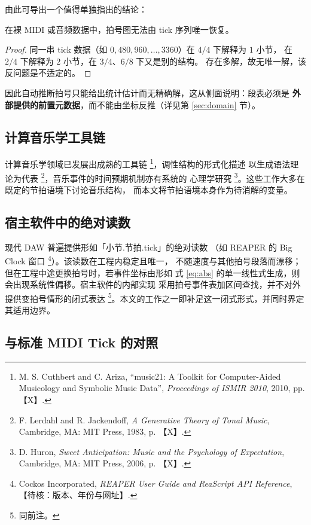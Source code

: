 \documentclass[11pt,a4paper,fontset=none]{ctexart}
\begin{document}
由此可导出一个值得单独指出的结论：

\begin{命题}
\label{prop:notick}
在裸 MIDI 或音频数据中，拍号图无法由 tick 序列唯一恢复。
\end{命题}

\begin{proof}
同一串 tick 数据（如 $0,480,960,\dots,3360$）在 $4/4$ 下解释为 $1$ 小节，
在 $2/4$ 下解释为 $2$ 小节，在 $3/4$、$6/8$ 下又是别的结构。
存在多解，故无唯一解，该反问题是不适定的。
\end{proof}

因此自动推断拍号只能给出统计估计而无精确解，这从侧面说明：段表必须是
\textbf{外部提供的前置元数据}，而不能由坐标反推（详见第 \ref{sec:domain} 节）。

\subsection{计算音乐学工具链}

计算音乐学领域已发展出成熟的工具链 \footnote{M. S. Cuthbert and C. Ariza, “music21: A Toolkit for Computer-Aided Musicology and Symbolic Music Data”, \emph{Proceedings of ISMIR 2010}, 2010, pp. 【X】.}，调性结构的形式化描述
以生成语法理论为代表 \footnote{F. Lerdahl and R. Jackendoff, \emph{A Generative Theory of Tonal Music}, Cambridge, MA: MIT Press, 1983, p. 【X】.}，音乐事件的时间预期机制亦有系统的
心理学研究 \footnote{D. Huron, \emph{Sweet Anticipation: Music and the Psychology of Expectation}, Cambridge, MA: MIT Press, 2006, p. 【X】.}。这些工作大多在既定的节拍语境下讨论音乐结构，
而本文将节拍语境本身作为待消解的变量。

\subsection{宿主软件中的绝对读数}

现代 DAW 普遍提供形如「小节.节拍.tick」的绝对读数
（如 REAPER 的 Big Clock 窗口 \footnote{Cockos Incorporated, \emph{REAPER User Guide and ReaScript API Reference}, 【待核：版本、年份与网址】.}）。该读数在工程内稳定且唯一，
不随速度与其他拍号段落而漂移；但在工程中途更换拍号时，若事件坐标由形如
式 \eqref{eq:abs} 的单一线性式生成，则会出现系统性偏移。宿主软件的内部实现
采用拍号事件表加区间查找，并不对外提供变拍号情形的闭式表达
\footnote{同前注。}。本文的工作之一即补足这一闭式形式，并同时界定其适用边界。

\subsection{与标准 MIDI Tick 的对照}
\end{document}
